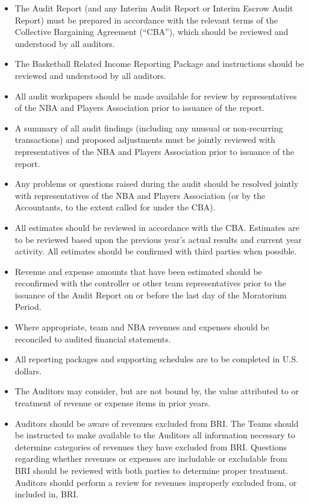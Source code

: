 \documentclass[
]{book}
\providecommand{\tightlist}{%
  \setlength{\itemsep}{0pt}\setlength{\parskip}{0pt}}
\begin{document}
\begin{itemize}
\tightlist
\item
  The Audit Report (and any Interim Audit Report or Interim Escrow Audit Report) must be prepared in accordance with the relevant terms of the Collective Bargaining Agreement (``CBA''), which should be reviewed and understood by all auditors.
\item
  The Basketball Related Income Reporting Package and instructions should be reviewed and understood by all auditors.
\item
  All audit workpapers should be made available for review by representatives of the NBA and Players Association prior to issuance of the report.
\item
  A summary of all audit findings (including any unusual or non-recurring transactions) and proposed adjustments must be jointly reviewed with representatives of the NBA and Players Association prior to issuance of the report.
\item
  Any problems or questions raised during the audit should be resolved jointly with representatives of the NBA and Players Association (or by the Accountants, to the extent called for under the CBA).
\item
  All estimates should be reviewed in accordance with the CBA. Estimates are to be reviewed based upon the previous year's actual results and current year activity. All estimates should be confirmed with third parties when possible.
\item
  Revenue and expense amounts that have been estimated should be reconfirmed with the controller or other team representatives prior to the issuance of the Audit Report on or before the last day of the Moratorium Period.
\item
  Where appropriate, team and NBA revenues and expenses should be reconciled to audited financial statements.
\item
  All reporting packages and supporting schedules are to be completed in U.S. dollars.
\item
  The Auditors may consider, but are not bound by, the value attributed to or treatment of revenue or expense items in prior years.
\item
  Auditors should be aware of revenues excluded from BRI. The Teams should be instructed to make available to the Auditors all information necessary to determine categories of revenues they have excluded from BRI. Questions regarding whether revenues or expenses are includable or excludable from BRI should be reviewed with both parties to determine proper treatment. Auditors should perform a review for revenues improperly excluded from, or included in, BRI.
\end{itemize}
\end{document}
